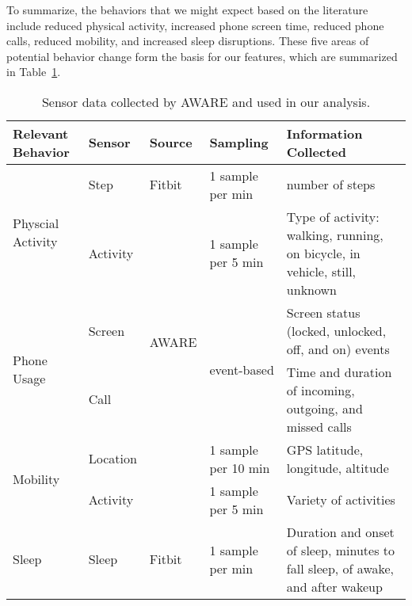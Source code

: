 \vspace{1em}
\noindent
To summarize, the behaviors that we might expect based on the literature include reduced physical activity, increased phone screen time, reduced phone calls, reduced mobility, and increased sleep disruptions. These five areas of potential behavior change form the basis for our features, which are summarized in Table~\ref{tab:study-sensors}.

\begin{table}[]
\centering
\smaller
\begin{tabular}{|l|l|l|l|p{5.5cm}|}
\hline
\textbf{Relevant Behavior}         & \textbf{Sensor} & \textbf{Source}        & \textbf{Sampling}            & \textbf{Information Collected}                                                 \\ \hline
\multirow{2}{*}{Physcial Activity} & Step            & Fitbit                 & 1 sample per min             & number of steps                                                                \\ \cline{2-5} 
                                   & Activity        & \multirow{4}{*}{AWARE} & 1 sample per 5 min           & Type of activity: walking, running, on bicycle, in vehicle, still, unknown     \\ \cline{1-2} \cline{4-5} 
\multirow{2}{*}{Phone Usage}                        & Screen          &                        & \multirow{2}{*}{event-based} & Screen status (locked, unlocked, off, and on) events                           \\ \cline{1-2} \cline{5-5} 
\multirow{2}{*}{Social Interactions} & Call            &                        &                              & Time and duration of incoming, outgoing, and missed calls                      \\ \cline{1-2} \cline{4-5} 
\multirow{2}{*}{Mobility}               & Location        &                        & 1 sample per 10 min          & GPS latitude, longitude, altitude                                              \\ \cline{2-2} \cline{4-5}
& Activity & & 1 sample per 5 min & Variety of activities \\ \hline
\multirow{2}{*}{Sleep }                             & Sleep           & Fitbit                 & 1 sample per min             & Duration and onset of sleep, minutes to fall sleep, of awake, and after wakeup \\ \hline
\end{tabular}

\caption[Sensors]{Sensor data collected by AWARE and used in our analysis.}
\label{tab:study-sensors}
\end{table}
